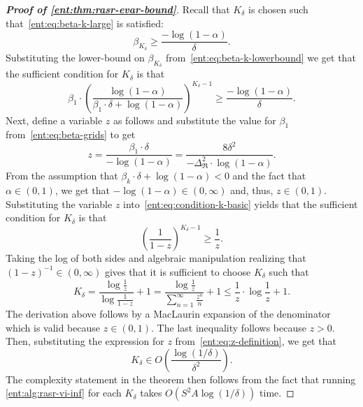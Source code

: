 \documentclass[twoside]{article}
\newcommand{\vspan}{\Delta_{\mathfrak{R}}}
\theoremstyle{plain}
\theoremstyle{definition}
\theoremstyle{remark}
\begin{document}
\begin{proof}[\textbf{Proof of \cref{ent:thm:rasr-evar-bound}}]
Recall that $K_{\delta}$ is chosen such that~\eqref{ent:eq:beta-k-large} is satisfied:
\[
  \beta_{K_{\delta}} \ge \frac{-\log (1-\alpha)}{\delta}.
\]
Substituting the lower-bound on $\beta_{K_{\delta}}$ from~\eqref{ent:eq:beta-k-lowerbound} we get that the sufficient condition for $K_{\delta}$ is that
%
\begin{equation}\label{ent:eq:condition-k-basic}
  \beta_1 \cdot \left(  \frac{\log (1-\alpha)}{ \beta_1\cdot \delta + \log (1-\alpha) } \right)^{K_{\delta}-1} \ge 
  \frac{-\log (1-\alpha)}{\delta}.
\end{equation}
%
Next, define a variable $z$ as follows and substitute the value for $\beta_1$ from~\eqref{ent:eq:beta-grids} to get
%
\begin{equation} \label{ent:eq:z-definition}
z = \frac{\beta_1 \cdot \delta}{- \log (1-\alpha)} = \frac{8 \delta^2}{-\vspan^2 \cdot \log (1-\alpha)}.
\end{equation}
%
From the assumption that $\beta_k \cdot \delta + \log (1-\alpha) < 0$ and the fact that $\alpha \in (0,1)$, we get that $-\log (1-\alpha) \in (0,\infty)$ and, thus, $z\in (0,1)$. Substituting the variable $z$ into~\eqref{ent:eq:condition-k-basic} yields that the sufficient condition for $K_{\delta}$ is that
\[
  \left( \frac{1}{1-z} \right)^{K_{\delta}-1} \ge \frac{1}{z}.
\]
Taking the log of both sides and algebraic manipulation realizing that $(1-z)^{-1}\in (0,\infty)$ gives that it is sufficient to choose $K_{\delta}$ such that
\[
 K_{\delta} = \frac{\log \frac{1}{z}}{\log \frac{1}{1-z}} + 1 =  \frac{\log \frac{1}{z}}{\sum_{n=1}^{\infty} \frac{z^n}{n}} + 1 \le \frac{1}{z} \cdot \log \frac{1}{z} + 1.
\]
The derivation above follows by a MacLaurin expansion of the denominator which is valid because $z\in (0,1)$. The last inequality follows because $z >0$. Then, substituting the expression for $z$ from~\eqref{ent:eq:z-definition}, we get that
\[
  K_{\delta} \in O\left(\frac{\log(1/\delta)}{\delta^2}\right).
\]
The complexity statement in the theorem then follows from the fact that running \cref{ent:alg:rasr-vi-inf} for each $K_{\delta}$ takes $O(S^2 A \log(1/\delta))$ time. 
\end{proof}


\end{document}
